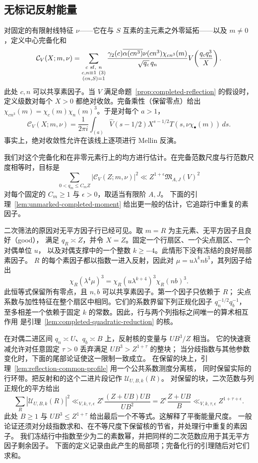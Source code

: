 \subsection{无标记反射能量}

对固定的有限射线特征 $\nu$——它在与 $S$ 互素的主元素之外零延拓——以及 $m\ne0$，定义中心完备化和
\begin{equation}\label{eq:unmarked-central-completion}
 \mathcal C_V(X;m,\nu)=
 \sum_{\substack{c\ {\rm sf},\ n\\c,n\equiv1\ (3)\\(cn,S)=1}}
 \frac{\gamma_2(c)\overline{\alpha(cn^3)}\nu(cn^3)\chi_{cn^3}(m)}
      {\sqrt{q_c}\,q_n}
 V\!\left(\frac{q_cq_n^3}{X}\right).
\end{equation}
此处 $c,n$ 可以共享素因子。当 $V$ 满足命题~\ref{prop:completed-reflection} 的假设时，
定义级数对每个 $X>0$ 都绝对收敛。完备乘性（保留零点）给出
$\chi_{cn^3}(m)=\chi_c(m)\chi_n(m)^3$。于是对每个 $a>1$，
\begin{equation}\label{eq:unmarked-central-mellin}
 \mathcal C_V(X;m,\nu)=\frac1{2\pi i}\int_{(a)}
 \widehat V(s-1/2)X^{s-1/2}T(s,\nu\chi_\bullet(m))\,ds.
\end{equation}
事实上，绝对收敛性允许在该线上逐项进行 Mellin 反演。


我们对这个完备化和在非零元素行上的均方进行估计。在完备范数尺度与行范数尺度相等时，目标是
\[
 \sum_{0<q_m\le C_mZ}|\mathcal C_V(Z;m,\nu)|^2
 \ll Z^{1+\epsilon}\mathfrak M_{A,J}(V)^2
\]
对每个固定的 $C_m\ge1$ 与 $\epsilon>0$，取适当有限阶 $A,J$。
下面的引理~\ref{lem:unmarked-completed-moment} 给出更一般的估计，它追踪行中重复的素因子。

二次筛法的原因对无平方因子行已经可见。取 $m=R$ 为主元素、无平方因子且良好（good），
满足 $q_R\asymp Z$，并令 $X=Z$。固定一个行扇区、一个尖点扇区、一个对偶单位 $u$，
以及对偶支撑中的一个整数 $k\ge-4$。此情形下没有冻结的良好局部素因子。
$R$ 的每个素因子都以指数一进入反射，因此对 $\mu=u\lambda^k n b^3$，其列因子给出
\[
 \chi_R(\lambda^4\mu)^3
 =\chi_R(u\lambda^{k+4})^3\chi_R(nb)^3.
\]
此恒等式保留所有零点，且 $n,b$ 可以共享素因子。第一个因子只依赖于 $R$；
尖点系数与加性特征在整个扇区中相同。它们的系数界留下列正规化因子 $q_n^{-1/2}q_b^{-1}$，
至多相差一个依赖于固定 $k$ 的常数。因此，行与两个列指标之间唯一的算术相互作用
是引理~\ref{lem:completed-quadratic-reduction} 的核。

在对偶二进区间 $q_n\asymp U$、$q_b\asymp B$ 上，反射核的变量与 $UB^3/Z$ 相当。
它的快速衰减允许对任意固定 $\tau>0$ 丢弃满足 $UB^3>Z^{1+\tau}$ 的整块；
当分歧指数与其他参数变化时，下面的尾部论证使这一限制一致成立。
在保留的块上，引理~\ref{lem:reflection-common-profile} 用一个公共系数测度分离核，
同时保留实际的行环带。把反射和的这个二进片段记作 $\mathcal U_{U,B,k}(R)$。
对保留的块，二次范数与列正规化的平方给出
\[
 \sum_R|\mathcal U_{U,B,k}(R)|^2
 \ll_{V,k,\tau,\epsilon}Z^\epsilon
       \frac{(Z+UB)UB}{UB^2}
 =Z^\epsilon\frac{Z+UB}{B}
 \ll_{V,k,\tau,\epsilon}Z^{1+\tau+\epsilon}.
\]
此处 $B\ge1$ 与 $UB^3\le Z^{1+\tau}$ 给出最后一个不等式。这解释了平衡能量尺度。
一般论证还须对分歧指数求和、在不等尺度下保留核的节省，并处理行中重复的素因子。
我们冻结行中指数至少为二的素数幂，并把同样的二次范数应用于其无平方因子剩余因子。
下面的定义记录由此产生的局部项；完备化行的引理随后对它们求和。

